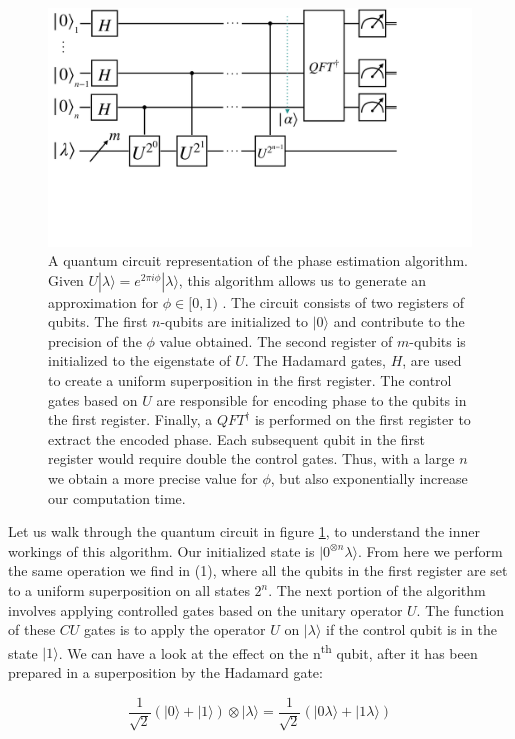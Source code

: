 \documentclass[msc,oneside]{ubcthesis}
\begin{document}
	
	\begin{figure}[!h]
		\centering
		\includegraphics[trim={1cm 12cm 11cm 0},clip, width=0.8 \linewidth]{"graphics/phase_circ"}
		\caption{A quantum circuit representation of the phase estimation algorithm. Given $ U |\lambda \rangle = e^{2\pi i \phi} |\lambda \rangle $, this algorithm allows us to generate an  approximation for $\phi \in [0,1)$ . The circuit consists of two registers of qubits. The first $n$-qubits are initialized to $|0\rangle$ and contribute to the precision of the $\phi$ value obtained. The second register of $m$-qubits is initialized to the eigenstate of $U$.  The Hadamard gates, $H$, are used to create a uniform superposition in the first register. The control gates based on $U$ are responsible for encoding phase to the qubits in the first register. Finally, a $QFT^\dagger$ is performed on the first register to extract the encoded phase. Each subsequent qubit in the first register would require double the control gates. Thus, with a large $n$ we obtain a more precise value for $\phi$, but also exponentially increase our computation time.}
		\label{fig:phasrcircuit}
	\end{figure}
	
	
	Let us walk through the quantum circuit in figure \ref{fig:phasrcircuit}, to understand the inner workings of this algorithm.	 Our initialized state is $|0^{\otimes n} \lambda\rangle$. From here we perform the same operation we find in (1), where all the qubits in the first register are set to a uniform superposition on all states $2^n$. The next portion of the algorithm involves applying controlled gates based on the unitary operator $U$. The function of these $CU$ gates is to apply the operator $U$ on $|\lambda\rangle$ if the control qubit is in the state $|1\rangle$. We can have a look at the effect on the n\textsuperscript{th} qubit, after it has been prepared in a superposition by the Hadamard gate:
	
	$$ \frac{1}{\sqrt{2}}(|0\rangle + |1\rangle) \otimes |\lambda\rangle =  \frac{1}{\sqrt{2}}(|0 \lambda \rangle + |1 \lambda\rangle)$$
	
\end{document}
